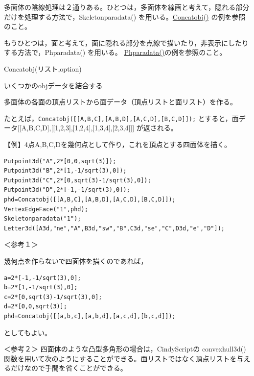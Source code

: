\documentclass[papersize,a4paper,12pt,uplatex]{jsarticle}
\begin{document}
多面体の陰線処理は２通りある。ひとつは，多面体を線画と考えて，隠れる部分だけを処理する方法で，Skeletonparadata() を用いる。\hyperlink{concatobj}{Concatobj()} の例を参照のこと。

もうひとつは，面と考えて，面に隠れる部分を点線で描いたり，非表示にしたりする方法で，Phparadata() を用いる。 \hyperlink{phparadata}{Phparadata()}の例を参照のこと。

\begin{description}

\hypertarget{concatobj}{}
\item[関数]Concatobj(リスト,option)
\item[機能]いくつかのobjデータを結合する
\item[説明]多面体の各面の頂点リストから面データ（頂点リストと面リスト）を作る。

たとえば，\verb|Concatobj([[A,B,C],[A,B,D],[A,C,D],[B,C,D]]);| とすると，面データ[[A,B,C,D],[[1,2,3],[1,2,4],[1,3,4],[2,3,4]]] が返される。

\vspace{\baselineskip}
【例】4点A,B,C,Dを幾何点として作り，これを頂点とする四面体を描く。

\begin{verbatim}
Putpoint3d("A",2*[0,0,sqrt(3)]);
Putpoint3d("B",2*[1,-1/sqrt(3),0]);
Putpoint3d("C",2*[0,sqrt(3)-1/sqrt(3),0]);
Putpoint3d("D",2*[-1,-1/sqrt(3),0]);
phd=Concatobj([[A,B,C],[A,B,D],[A,C,D],[B,C,D]]);
VertexEdgeFace("1",phd);
Skeletonparadata("1");
Letter3d([A3d,"ne","A",B3d,"sw","B",C3d,"se","C",D3d,"e","D"]);
\end{verbatim}

\begin{center}  \end{center}

＜参考１＞

幾何点を作らないで四面体を描くのであれば，

\begin{verbatim}
a=2*[-1,-1/sqrt(3),0];
b=2*[1,-1/sqrt(3),0];
c=2*[0,sqrt(3)-1/sqrt(3),0];
d=2*[0,0,sqrt(3)];
phd=Concatobj([[a,b,c],[a,b,d],[a,c,d],[b,c,d]]);
\end{verbatim}

としてもよい。

\vspace{\baselineskip}
＜参考２＞
四面体のような凸型多角形の場合は，CindyScriptの convexhull3d() 関数を用いて次のようにすることができる。面リストではなく頂点リストを与えるだけなので手間を省くことができる。


\end{description}
\end{document}
